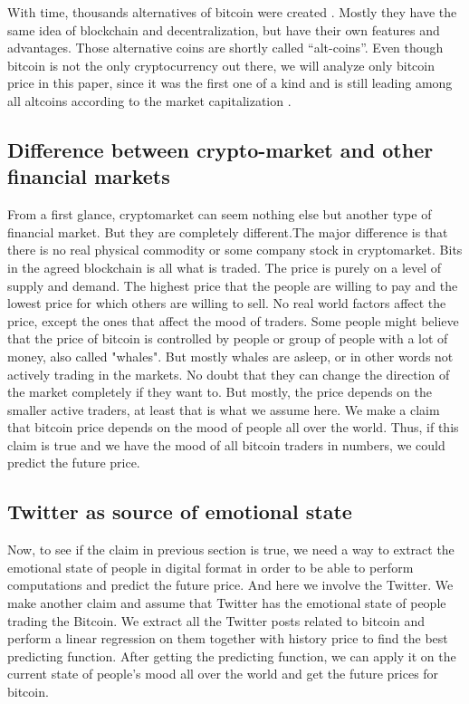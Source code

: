 \documentclass[a4paper,11pt,oneside]{article}
\begin{document}
  With time, thousands alternatives of bitcoin were created \cite{cryptolist}. Mostly they have the same idea of blockchain and decentralization, but have their own features and advantages. Those alternative coins are shortly called “alt-coins”. Even though bitcoin is not the only cryptocurrency out there, we will analyze only bitcoin price in this paper, since it was the first one of a kind and is still leading among all altcoins according to the market capitalization \cite{cryptolist}.
  
  \subsection{Difference between crypto-market and other financial markets}
  
  From a first glance, cryptomarket can seem nothing else but another type of financial market. But they are completely different.The major difference is that there is no real physical commodity or some company stock in cryptomarket. Bits in the agreed blockchain is all what is traded. The price is purely on a level of supply and demand. The highest price that the people are willing to pay and the lowest price for which others are willing to sell. No real world factors affect the price, except the ones that affect the mood of traders. Some people might believe that the price of bitcoin is controlled by people or group of people with a lot of money, also called "whales". But mostly whales are asleep, or in other words not actively trading in the markets. No doubt that they can change the direction of the market completely if they want to. But mostly, the price depends on the smaller active traders, at least that is what we assume here. We make a claim that bitcoin price depends on the mood of people all over the world. Thus, if this claim is true and we have the mood of all bitcoin traders in numbers, we could predict the future price.
  
  \subsection{Twitter as source of emotional state}
  
  Now, to see if the claim in previous section is true, we need a way to extract the emotional state of people in digital format in order to be able to perform computations and predict the future price. And here we involve the Twitter. We make another claim and assume that Twitter has the emotional state of people trading the Bitcoin. We extract all the Twitter posts related to bitcoin and perform a linear regression on them together with history price to find the best predicting function. After getting the predicting function, we can apply it on the current state of people’s mood all over the world and get the future prices for bitcoin. 
  
\end{document}
